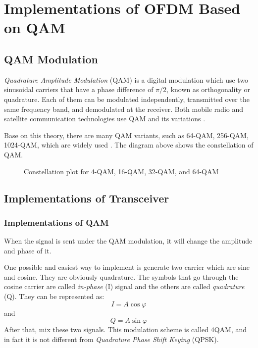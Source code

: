 \documentclass[10pt]{article}
\numberwithin{figure}{section}
\numberwithin{equation}{section}
\begin{document}
\section{Implementations of OFDM Based on QAM}
\subsection{QAM Modulation}
\textit{Quadrature Amplitude Modulation} (QAM) is a digital modulation which use two sinusoidal carriers that have a phase difference of $\pi/2$, known as orthogonality or quadrature. Each of them can be modulated independently, transmitted over the same frequency band, and demodulated at the receiver. Both mobile radio and satellite communication technologies use QAM and its variations \cite{RN77}.

Base on this theory, there are many QAM variants, such as 64-QAM, 256-QAM, 1024-QAM, which are widely used \cite{RN77}. The diagram above shows the constellation of QAM.
\begin{figure}[!h]
    \centering
    
    \caption{Constellation plot for 4-QAM, 16-QAM, 32-QAM, and 64-QAM}
    \label{fig:Constellation of QAM}
\end{figure}
\subsection{Implementations of Transceiver}
\subsubsection{Implementations of QAM}
When the signal is sent under the QAM modulation, it will change the amplitude and phase of it. 


One possible and easiest way to implement is generate two carrier which are sine and cosine. They are obviously quadrature. The symbols that go through the cosine carrier are called \textit{in-phase} (I) signal and the others are called \textit{quadrature} (Q). They can be represented as: 
\begin{equation}
I = A\cos{\varphi} \label{con:i signal}
\end{equation}
and
\begin{equation}
Q = A\sin{\varphi} \label{con:q signal}
\end{equation}
After that, mix these two signals. This modulation scheme is called 4QAM, and in fact it is not different from \textit{Quadrature Phase Shift Keying} (QPSK).
\end{document}
